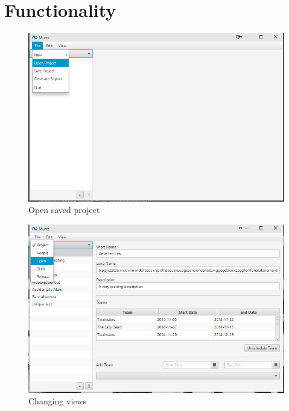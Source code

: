 \section{Functionality}


\begin{figure}[H]
\centering
\includegraphics[width=\textwidth]{images/screenshots/openProject.png}
\caption{Open saved project}
\label{fig:open_project}
\end{figure}

\begin{figure}[H]
\centering
\includegraphics[width=\textwidth]{images/screenshots/changeListView.png}
\caption{Changing views}
\label{fig:change_view}
\end{figure}

